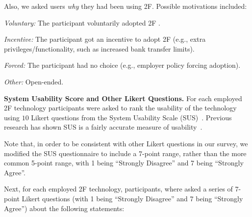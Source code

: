 \documentclass[conference]{IEEEtran}
\newcommand{\descr}[1]{\vspace{0.25cm} \noindent \textbf{#1}}
\begin{document}
Also, we asked users {\em why} they had been using 2F. Possible motivations included:
\begin{compactitem}
\item {\em Voluntary:} The participant voluntarily adopted 2F .
\item {\em Incentive:} The participant got an incentive to adopt 2F (e.g., extra privileges/functionality, such as increased bank transfer limits).
\item {\em Forced:} The participant had no choice (e.g., employer policy forcing adoption).
\item {\em Other:} Open-ended.
\end{compactitem}


\descr{System Usability Score and Other Likert Questions.}
For each employed 2F technology participants were asked to rank the usability of the technology using $10$ Likert questions from the System Usability Scale (SUS)~\cite{brooke1996sus}. Previous research has shown SUS is a fairly accurate measure of usability~\cite{bangor2008empirical}. 



Note that, in order to be consistent with other Likert questions in our survey, we modified the SUS questionnaire to include a 7-point range, rather than the more common 5-point range, with 1 being ``Strongly Disagree'' and 7 being ``Strongly Agree''. 



Next, for each employed 2F technology, participants, where asked a series of 7-point Likert questions (with 1 being ``Strongly Disagree'' and 7 being ``Strongly Agree'') about the following statements:
\end{document}
